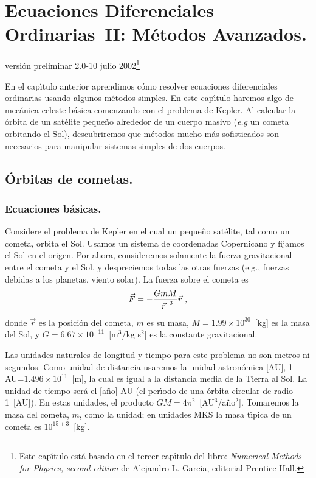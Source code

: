 \chapter[EDO II: M{\'e}todos Avanzados.]
{Ecuaciones Diferenciales Ordinarias~II: M{\'e}todos Avanzados.}


\vspace{-1cm} \hfill {\tiny versi{\'o}n preliminar 2.0-10 julio 2002\footnote{Este cap{\'\i}tulo
    est{\'a} basado en el tercer cap{\'\i}tulo del libro: {\em Numerical
      Methods for Physics, second edition} de Alejandro L. Garcia,
    editorial {\sc Prentice Hall}.}}


En el cap{\'\i}tulo anterior aprendimos c{\'o}mo resolver ecuaciones
diferenciales ordinarias usando algunos m{\'e}todos simples. En este
cap{\'\i}tulo haremos algo de mec{\'a}nica celeste b{\'a}sica comenzando con el
problema de Kepler.  Al calcular la {\'o}rbita de un sat{\'e}lite peque{\~n}o
alrededor de un cuerpo masivo ({\it e.g} un cometa orbitando el Sol),
descubriremos que m{\'e}todos mucho m{\'a}s sofisticados son necesarios para
manipular sistemas simples de dos cuerpos. 

\section{{\'O}rbitas de cometas.}

\subsection{Ecuaciones b{\'a}sicas.}

Considere el problema de Kepler en el cual un peque{\~n}o sat{\'e}lite, tal
como un cometa, orbita el Sol. Usamos un sistema de coordenadas
Copernicano y fijamos el Sol en el origen. Por ahora, consideremos
solamente la fuerza gravitacional entre el cometa y el Sol, y
despreciemos todas las otras fuerzas (e.g., fuerzas debidas a los 
planetas, viento solar). La fuerza sobre el cometa es
\begin{equation}
\label{c11-e3.1}
\vec F= -\frac{GmM}{\left\lvert\, \vec r \,\right\lvert^3}\vec r\ ,
\end{equation}
donde $\vec r$ es la posici{\'o}n del cometa, $m$ es su masa,
$M=1.99\times10^{30}$~[kg] es la masa del Sol, y $G=6.67\times
10^{-11}$~[m$^3$/kg s$^2$] es la constante gravitacional.

Las unidades naturales de longitud y tiempo para este problema no son
metros ni segundos. Como unidad de distancia usaremos la unidad
astron{\'o}mica [AU], 1 AU=$1.496\times10^{11}$~[m], la cual es igual a la
distancia media de la Tierra al Sol. La unidad de tiempo ser{\'a} el [a{\~n}o]
AU (el per{\'\i}odo de una {\'o}rbita circular de radio 1~[AU]). En estas
unidades, el producto $GM=4\pi^2$~[AU$^3$/a{\~n}o$^2$]. Tomaremos la
masa del cometa, $m$, como la unidad; en unidades MKS la masa t{\'\i}pica
de un cometa es $10^{15\pm3}$~[kg].

